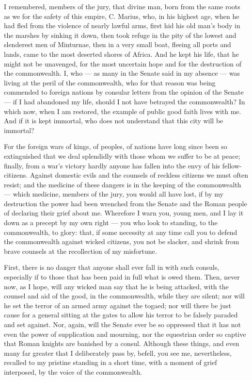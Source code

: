 I remembered, members of the jury, that divine man, born from the same roots as we for the safety of this empire, C. Marius, who, in his highest age, when he had fled from the violence of nearly lawful arms, first hid his old man's body in the marshes by sinking it down, then took refuge in the pity of the lowest and slenderest men of Minturnae, then in a very small boat, fleeing all ports and lands, came to the most deserted shores of Africa. And he kept his life, that he might not be unavenged, for the most uncertain hope and for the destruction of the commonwealth. I, who --- as many in the Senate said in my absence --- was living at the peril of the commonwealth, who for that reason was being commended to foreign nations by consular letters from the opinion of the Senate --- if I had abandoned my life, should I not have betrayed the commonwealth? In which now, when I am restored, the example of public good faith lives with me. And if it is kept immortal, who does not understand that this city will be immortal?

 For the foreign wars of kings, of peoples, of nations have long since been so extinguished that we deal splendidly with those whom we suffer to be at peace; finally, from a war's victory hardly anyone has fallen into the envy of his fellow-citizens. Against domestic evils and the counsels of reckless citizens we must often resist; and the medicine of these dangers is in the keeping of the commonwealth --- which medicine, members of the jury, you would all have lost, if by my destruction the power had been wrenched from the Senate and the Roman people of declaring their grief about me. Wherefore I warn you, young men, and I lay it down as a precept by my own right --- you who look to standing, to the commonwealth, to glory: that, if some necessity at any time call you to defend the commonwealth against wicked citizens, you not be slacker, and shrink from brave counsels at the recollection of my misfortune.

 First, there is no danger that anyone shall ever fall in with such consuls, especially if to those that has been paid in full what is owed them. Then, never now, as I hope, will any wicked man say that he is being attacked, with the counsel and aid of the good, in the commonwealth, while they are silent; nor will he set the terror of an armed army against the togaed; nor will there be just cause for a general sitting at the gates to allow his terror to be falsely paraded and set against. Nor, again, will the Senate ever be so oppressed that it has not even the power of supplication and mourning, nor the equestrian order so captive that Roman knights are banished by a consul. Although these things, and even many far greater that I deliberately pass by, befell, you see me, nevertheless, recalled to my pristine standing in a short time, with a moment of grief interposed, by the voice of the commonwealth.

